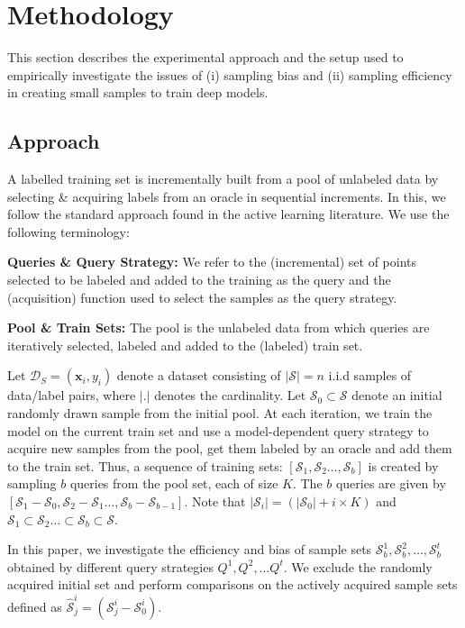 \documentclass[11pt,a4paper]{article}
\begin{document}
\section{Methodology}\label{sec:method}
This section describes the experimental approach and the setup used to empirically investigate the issues of (i) sampling bias and (ii) sampling efficiency in creating small samples to train deep models.

\subsection{Approach}
A labelled training set is incrementally built from a pool of unlabeled data by selecting \& acquiring labels from an oracle in sequential increments. In this, we follow  the standard approach found in the active learning literature. We use the following terminology:

\textbf{Queries \& Query Strategy:} We refer to the (incremental) set of points selected to be labeled and added to the training as the query and the (acquisition) function used to select the samples as the query strategy. 

\textbf{Pool \& Train Sets:} The pool is the unlabeled data from which queries are iteratively selected, labeled and added to the (labeled) train set. 

Let $\mathcal{D}_S = (\mathbf{x}_i, y_i)$ denote a dataset consisting of $\vert \mathcal{S} \vert  = n$ i.i.d samples of data/label pairs, where $\vert . \vert$ denotes the cardinality. Let $\mathcal{S}_0 \subset \mathcal{S}$ denote an initial randomly drawn sample from the initial pool. At each iteration, we train the model on the current train set and use a model-dependent query strategy to acquire new samples from the pool, get them labeled by an oracle and add them to the train set. Thus, a sequence of training sets: $[ \mathcal{S}_1,\mathcal{S}_2\ldots,\mathcal{S}_{b}]$ is created by sampling $b$ queries from the pool set, each of size $K$. The $b$ queries are given by $[ \mathcal{S}_1-\mathcal{S}_0,\mathcal{S}_2-\mathcal{S}_1\ldots,\mathcal{S}_{b}-\mathcal{S}_{b-1}]$. Note that $|\mathcal{S}_i| = (|\mathcal{S}_0| + i \times K)$ and $\mathcal{S}_1 \subset \mathcal{S}_2 \ldots \subset \mathcal{S}_b \subset \mathcal{S}$. 

In this paper, we investigate the efficiency and bias of sample sets $\mathcal{S}_{b}^{1}, \mathcal{S}_{b}^{2}, \ldots, \mathcal{S}_{b}^{t}$ obtained by different query strategies $Q^1, Q^2, \ldots Q^t$. We exclude the randomly acquired initial set and perform comparisons on the actively acquired sample sets defined as $\hat{\mathcal{S}}_{j}^i = (\mathcal{S}_{j}^{i} - \mathcal{S}_0^{i})$.
\end{document}
